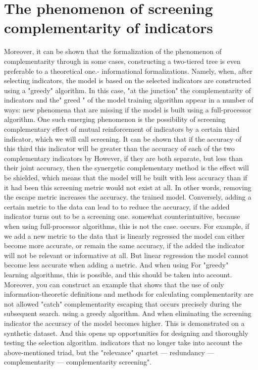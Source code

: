 \documentclass[12pt]{a&t}
\begin{document}
\section{The phenomenon of screening complementarity of indicators}

Moreover, it can be shown that the formalization of the phenomenon of complementarity through
in some cases, constructing a two-tiered tree is even preferable to a theoretical one.-
informational formalizations. Namely, when, after selecting indicators, the model is based on
the selected indicators are constructed using a "greedy" algorithm. In this case, "at the junction"
the complementarity of indicators and the" greed " of the model training algorithm appear in a number of ways:
new phenomena that are missing if the model is built using a full-processor algorithm.
One such emerging phenomenon is the possibility of screening
complementary effect of mutual reinforcement of indicators by a certain third indicator,
which we will call screening. It can be shown that if the accuracy of this third
this indicator will be greater than the accuracy of each of the two complementary indicators by
However, if they are both separate, but less than their joint accuracy, then the synergetic complementary method is
the effect will be shielded, which means that the model will be built with less accuracy than if it had been
this screening metric would not exist at all.
In other words, removing the escape metric increases the accuracy.
the trained model. Conversely, adding a certain metric to the data can lead to
to reduce the accuracy, if the added indicator turns out to be a screening one.
somewhat counterintuitive, because when using full-processor algorithms, this is not the case.
occurs. For example, if we add a new metric to the data that is linearly regressed
the model can either become more accurate, or remain the same accuracy, if the added
the indicator will not be relevant or informative at all. But linear regression
the model cannot become less accurate when adding a metric. And when using
For "greedy" learning algorithms, this is possible, and this should be taken into account.
Moreover, you can construct an example that shows that the use of only
information-theoretic definitions and methods for calculating complementarity are not allowed
"catch" complementarity escaping that occurs precisely during the subsequent search.
using a greedy algorithm. And when eliminating the screening indicator
the accuracy of the model becomes higher. This is demonstrated on a synthetic dataset. And
this opens up opportunities for designing and thoroughly testing the selection algorithm.
indicators that no longer take into account the above-mentioned triad, but the "relevance" quartet —
redundancy — complementarity — complementarity screening".
\end{document}
